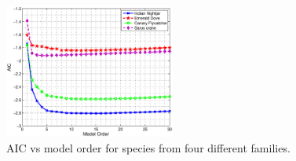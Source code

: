 \documentclass[a4paper]{article}
\begin{document}
 
 
%

 
 \begin{figure}[!ht]
	\centering
	\includegraphics[width=0.5\textwidth,height=7 cm] {species_4.eps}
	\caption{AIC vs model order for species from four different families.}   
	\label{fig:species_4}
\end{figure} 
 
 
 
 
%
% 
% 
 
\end{document}

